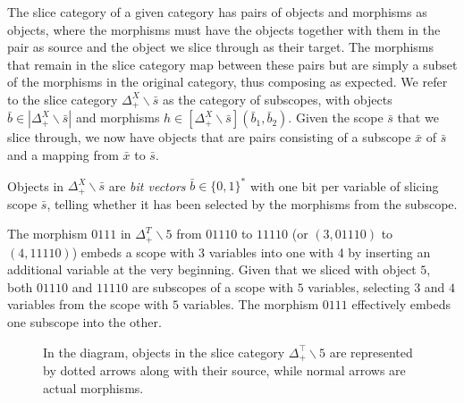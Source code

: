 \documentclass[runningheads]{llncs}
\begin{document}
The slice category of a given category has pairs of objects and morphisms as objects, where the morphisms must have the objects together with them in the pair as source and the object we slice through as their target.
The morphisms that remain in the slice category map between these pairs but are simply a subset of the morphisms in the original category, thus composing as expected.
We refer to the slice category $Δ_+^X∖\bar{s}$ as the category of subscopes, with objects $\bar{b} \in |Δ_+^X∖\bar{s}|$ and morphisms $h \in [Δ_+^X∖\bar{s}](\bar{b}_1, \bar{b}_2)$.
Given the scope $\bar{s}$ that we slice through, we now have objects that are pairs consisting of a subscope $\bar{x}$ of $\bar{s}$ and a mapping from $\bar{x}$ to $\bar{s}$.

\begin{remark}
  Objects in $Δ_+^X∖\bar{s}$ are \emph{bit vectors} $\bar{b} ∈ \{0, 1\}^*$ with one bit per variable of slicing scope $\bar{s}$, telling whether it has been selected by the morphisms from the subscope.
\end{remark}
\begin{example}
  The morphism $0111$ in $Δ_+^T∖5$ from $01110$ to $11110$ (or $(3, 01110)$ to $(4, 11110)$) embeds a scope with 3 variables into one with 4 by inserting an additional variable at the very beginning.
  Given that we sliced with object $5$, both $01110$ and $11110$ are subscopes of a scope with $5$ variables, selecting $3$ and $4$ variables from the scope with $5$ variables. The morphism $0111$ effectively embeds one subscope into the other.
  \begin{figure}[]
    \centering
    \caption{In the diagram, objects in the slice category $Δ_+^⊤∖5$ are represented by dotted arrows along with their source, while normal arrows are actual morphisms.}
    \label{fig:ex3}
  \end{figure}
\end{example}
\end{document}
